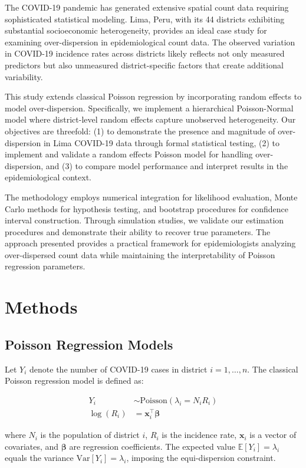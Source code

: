 \documentclass[11pt]{article}
\begin{document}
The COVID-19 pandemic has generated extensive spatial count data requiring sophisticated statistical modeling. Lima, Peru, with its 44 districts exhibiting substantial socioeconomic heterogeneity, provides an ideal case study for examining over-dispersion in epidemiological count data. The observed variation in COVID-19 incidence rates across districts likely reflects not only measured predictors but also unmeasured district-specific factors that create additional variability.

This study extends classical Poisson regression by incorporating random effects to model over-dispersion. Specifically, we implement a hierarchical Poisson-Normal model where district-level random effects capture unobserved heterogeneity. Our objectives are threefold: (1) to demonstrate the presence and magnitude of over-dispersion in Lima COVID-19 data through formal statistical testing, (2) to implement and validate a random effects Poisson model for handling over-dispersion, and (3) to compare model performance and interpret results in the epidemiological context.

The methodology employs numerical integration for likelihood evaluation, Monte Carlo methods for hypothesis testing, and bootstrap procedures for confidence interval construction. Through simulation studies, we validate our estimation procedures and demonstrate their ability to recover true parameters. The approach presented provides a practical framework for epidemiologists analyzing over-dispersed count data while maintaining the interpretability of Poisson regression parameters.

\section{Methods}

\subsection{Poisson Regression Models}

Let $Y_i$ denote the number of COVID-19 cases in district $i = 1, \ldots, n$. The classical Poisson regression model is defined as:

\begin{align}
Y_i &\sim \text{Poisson}(\lambda_i = N_i R_i) \\
\log(R_i) &= \mathbf{x}_i^\top \boldsymbol{\beta}
\end{align}

where $N_i$ is the population of district $i$, $R_i$ is the incidence rate, $\mathbf{x}_i$ is a vector of covariates, and $\boldsymbol{\beta}$ are regression coefficients. The expected value $\mathbb{E}[Y_i] = \lambda_i$ equals the variance $\text{Var}[Y_i] = \lambda_i$, imposing the equi-dispersion constraint.
\end{document}
